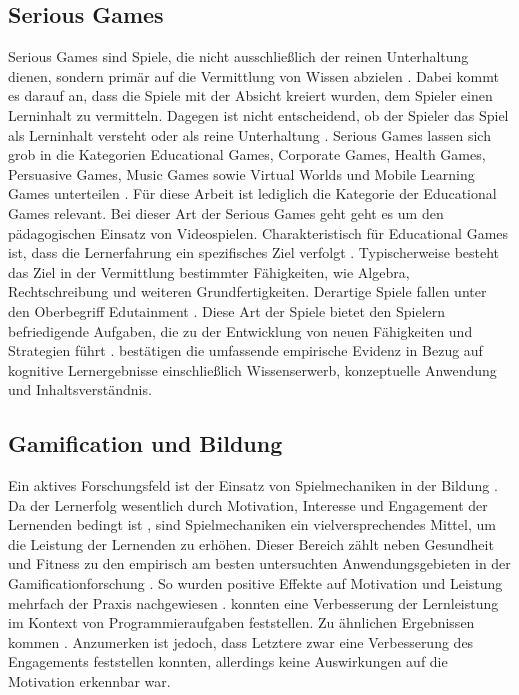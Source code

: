 \subsection{Serious Games}
Serious Games sind Spiele, die nicht ausschließlich der reinen Unterhaltung dienen, sondern primär auf die Vermittlung von Wissen abzielen \cite[S.17]{michael_serious_2005}.
Dabei kommt es darauf an, dass die Spiele mit der Absicht kreiert wurden, dem Spieler einen Lerninhalt zu vermitteln.
Dagegen ist nicht entscheidend, ob der Spieler das Spiel als Lerninhalt versteht oder als reine Unterhaltung \cite[S.3]{bopp_serious_2009}.
Serious Games lassen sich grob in die Kategorien Educational  Games, 
Corporate  Games,  Health  Games,  Persuasive  Games,  Music  Games  sowie  Virtual  Worlds  und 
Mobile Learning Games unterteilen \cite[S.4]{bopp_serious_2009}.
Für diese Arbeit ist lediglich die Kategorie der Educational  Games relevant.
Bei dieser Art der Serious Games geht geht es um den pädagogischen Einsatz von Videospielen.
Charakteristisch für Educational  Games ist, dass die Lernerfahrung ein spezifisches Ziel verfolgt \cite{nielsen_overview_2006, bopp_serious_2009}.
Typischerweise besteht das Ziel in der Vermittlung bestimmter Fähigkeiten, wie Algebra, Rechtschreibung und weiteren Grundfertigkeiten.
Derartige Spiele fallen unter den Oberbegriff Edutainment \cite{nielsen_overview_2006}.
Diese Art der Spiele bietet den Spielern befriedigende Aufgaben, die zu der Entwicklung von neuen Fähigkeiten und Strategien führt \cite{stapleton_serious_2004}.
\citeauthor{vlachopoulos_effect_2017} bestätigen die umfassende empirische Evidenz in Bezug auf kognitive Lernergebnisse einschließlich Wissenserwerb, konzeptuelle Anwendung und Inhaltsverständnis.


\subsection{Gamification und Bildung}
Ein aktives Forschungsfeld ist der Einsatz von Spielmechaniken in der Bildung \cite{ibanez_gamification_2014,landers_enhancing_2017}. Da der Lernerfolg wesentlich durch Motivation, Interesse und Engagement der Lernenden bedingt ist \cite{astin_student_1984}, sind Spielmechaniken ein vielversprechendes Mittel, um die Leistung der Lernenden zu erhöhen.
Dieser Bereich zählt neben Gesundheit und Fitness zu den empirisch am besten untersuchten Anwendungsgebieten in der Gamificationforschung \cite{koivisto_rise_2019}.
So wurden positive Effekte auf Motivation und Leistung mehrfach der Praxis nachgewiesen \cite{ibanez_gamification_2014,hamzah_influence_2015,strmecki_gamification_2015}. \cite{layth_khaleel_empirical_2019} konnten eine Verbesserung der Lernleistung im Kontext von Programmieraufgaben feststellen. Zu ähnlichen Ergebnissen kommen \cite{ortiz_gamification_2017}. Anzumerken ist jedoch, dass Letztere zwar eine Verbesserung des Engagements feststellen konnten, allerdings keine Auswirkungen auf die Motivation erkennbar war.